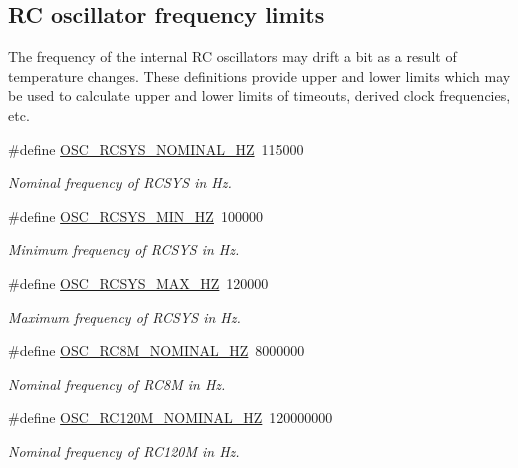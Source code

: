 \subsection*{\-R\-C oscillator frequency limits}
\label{_amgrpbce3bcf546eebe0f0366e196f2536789}%
 \-The frequency of the internal \-R\-C oscillators may drift a bit as a result of temperature changes. \-These definitions provide upper and lower limits which may be used to calculate upper and lower limits of timeouts, derived clock frequencies, etc. \begin{DoxyCompactItemize}
\item 
\#define \hyperlink{group__osc__group_gac6f0fa483cea89b90b34a7e29b5b8834}{\-O\-S\-C\-\_\-\-R\-C\-S\-Y\-S\-\_\-\-N\-O\-M\-I\-N\-A\-L\-\_\-\-H\-Z}~115000
\begin{DoxyCompactList}\small\item\em \-Nominal frequency of \-R\-C\-S\-Y\-S in \-Hz. \end{DoxyCompactList}\item 
\#define \hyperlink{group__osc__group_gaa2e74d0d1752ab53d339808b4ab42799}{\-O\-S\-C\-\_\-\-R\-C\-S\-Y\-S\-\_\-\-M\-I\-N\-\_\-\-H\-Z}~100000
\begin{DoxyCompactList}\small\item\em \-Minimum frequency of \-R\-C\-S\-Y\-S in \-Hz. \end{DoxyCompactList}\item 
\#define \hyperlink{group__osc__group_gad6d2678e501e5313cfd5156b0ba93039}{\-O\-S\-C\-\_\-\-R\-C\-S\-Y\-S\-\_\-\-M\-A\-X\-\_\-\-H\-Z}~120000
\begin{DoxyCompactList}\small\item\em \-Maximum frequency of \-R\-C\-S\-Y\-S in \-Hz. \end{DoxyCompactList}\item 
\#define \hyperlink{group__osc__group_ga29780a3cc29d5015d64e6e359003027c}{\-O\-S\-C\-\_\-\-R\-C8\-M\-\_\-\-N\-O\-M\-I\-N\-A\-L\-\_\-\-H\-Z}~8000000
\begin{DoxyCompactList}\small\item\em \-Nominal frequency of \-R\-C8\-M in \-Hz. \end{DoxyCompactList}\item 
\#define \hyperlink{group__osc__group_gab081db8e207b2d76293e6ded06f5dd01}{\-O\-S\-C\-\_\-\-R\-C120\-M\-\_\-\-N\-O\-M\-I\-N\-A\-L\-\_\-\-H\-Z}~120000000
\begin{DoxyCompactList}\small\item\em \-Nominal frequency of \-R\-C120\-M in \-Hz. \end{DoxyCompactList}\end{DoxyCompactItemize}


